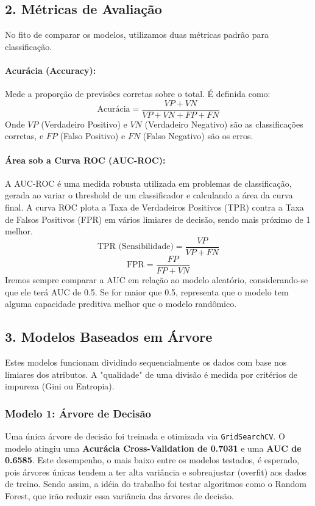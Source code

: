 \subsection*{2. Métricas de Avaliação}
No fito de comparar os modelos, utilizamos duas métricas padrão para classificação.

\paragraph{Acurácia (Accuracy):} Mede a proporção de previsões corretas sobre o total. É definida como:
$$ \text{Acurácia} = \frac{VP + VN}{VP + VN + FP + FN} $$
Onde $VP$ (Verdadeiro Positivo) e $VN$ (Verdadeiro Negativo) são as classificações corretas, e $FP$ (Falso Positivo) e $FN$ (Falso Negativo) são os erros.

\paragraph{Área sob a Curva ROC (AUC-ROC):} A AUC-ROC é uma medida robusta utilizada em problemas de classificação, gerada ao variar o threshold de um classificador e calculando a área da curva final. A curva ROC plota a Taxa de Verdadeiros Positivos (TPR) contra a Taxa de Falsos Positivos (FPR) em vários limiares de decisão, sendo mais próximo de 1 melhor.
$$ \text{TPR (Sensibilidade)} = \frac{VP}{VP + FN} $$
$$ \text{FPR} = \frac{FP}{FP + VN} $$
Iremos sempre comparar a AUC em relação ao modelo aleatório, considerando-se que ele terá AUC de 0.5. Se for maior que 0.5, representa que o modelo tem alguma capacidade preditiva melhor que o modelo randômico.
\vspace{5mm}
\subsection*{3. Modelos Baseados em Árvore}
Estes modelos funcionam dividindo sequencialmente os dados com base nos limiares dos atributos. A "qualidade" de uma divisão é medida por critérios de impureza (Gini ou Entropia).

\subsubsection*{Modelo 1: Árvore de Decisão}
Uma única árvore de decisão foi treinada e otimizada via \texttt{GridSearchCV}.
O modelo atingiu uma \textbf{Acurácia Cross-Validation de 0.7031}  e uma \textbf{AUC de 0.6585}.
Este desempenho, o mais baixo entre os modelos testados, é esperado, pois árvores únicas tendem a ter alta variância e sobreajustar (overfit) aos dados de treino. Sendo assim, a idéia do trabalho foi testar algoritmos como o Random Forest, que irão reduzir essa variância das árvores de decisão.
\vspace{5mm}
